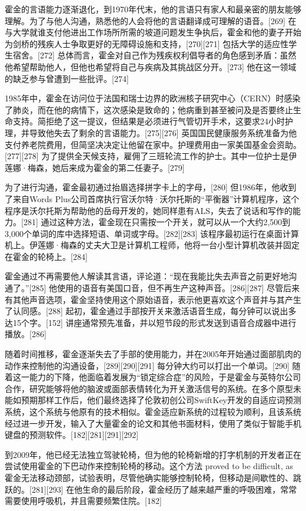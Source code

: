 霍金的言语能力逐渐退化，到1970年代末，他的言语只有家人和最亲密的朋友能够理解。为了与他人沟通，熟悉他的人会将他的言语翻译成可理解的语音。[269] 在与大学就谁支付他进出工作场所所需的坡道问题发生争执后，霍金和他的妻子开始为剑桥的残疾人士争取更好的无障碍设施和支持，[270][271] 包括大学的适应性学生宿舍。[272] 总体而言，霍金对自己作为残疾权利倡导者的角色感到矛盾：虽然他希望帮助他人，但他也希望将自己与疾病及其挑战区分开。[273] 他在这一领域的缺乏参与曾遭到一些批评。[274]

1985年中，霍金在访问位于法国和瑞士边界的欧洲核子研究中心（CERN）时感染了肺炎，而在他的病情下，这次感染是致命的；他病重到甚至被问及是否要终止生命支持。简拒绝了这一提议，但结果是必须进行气管切开手术，这要求24小时护理，并导致他失去了剩余的言语能力。[275][276] 英国国民健康服务系统准备为他支付养老院费用，但简坚决决定让他留在家中。护理费用由一家美国基金会资助。[277][278] 为了提供全天候支持，雇佣了三班轮流工作的护士。其中一位护士是伊莲娜·梅森，她后来成为霍金的第二任妻子。[279]

为了进行沟通，霍金最初通过抬眉选择拼字卡上的字母，[280] 但1986年，他收到了来自Words Plus公司首席执行官沃尔特·沃尔托斯的“平衡器”计算机程序，这个程序是沃尔托斯为帮助他的岳母开发的，她同样患有ALS，失去了说话和写作的能力。[281] 通过这种方法，霍金现在只需按一个开关，就可以从一个大约2,500到3,000个单词的库中选择短语、单词或字母。[282][283] 该程序最初运行在桌面计算机上。伊莲娜·梅森的丈夫大卫是计算机工程师，他将一台小型计算机改装并固定在霍金的轮椅上。[284]

霍金通过不再需要他人解读其言语，评论道：“现在我能比失去声音之前更好地沟通了。”[285] 他使用的语音有美国口音，但不再生产这种声音。[286][287] 尽管后来有其他声音选项，霍金坚持使用这个原始语音，表示他更喜欢这个声音并与其产生了认同感。[288] 起初，霍金通过手部按开关来激活语音生成，每分钟可以说出多达15个字。[152] 讲座通常预先准备，并以短节段的形式发送到语音合成器中进行播放。[286]

随着时间推移，霍金逐渐失去了手部的使用能力，并在2005年开始通过面部肌肉的动作来控制他的沟通设备，[289][290][291] 每分钟大约可以打出一个单词。[290] 随着这一能力的下降，他面临着发展为“锁定综合症”的风险，于是霍金与英特尔公司合作，研究能够将他的脑波或面部表情转化为开关激活信号的系统。在多个原型未能如预期那样工作后，他们最终选择了伦敦初创公司SwiftKey开发的自适应词预测系统，这个系统与他原有的技术相似。霍金适应新系统的过程较为顺利，且该系统经过进一步开发，输入了大量霍金的论文和其他书面材料，使用了类似于智能手机键盘的预测软件。[182][281][291][292]

到2009年，他已经无法独立驾驶轮椅，但为他的轮椅新增的打字机制的开发者正在尝试使用霍金的下巴动作来控制轮椅的移动。这个方法 proved to be difficult, as霍金无法移动颈部，试验表明，尽管他确实能够控制轮椅，但移动是间歇性的、跳跃的。[281][293] 在他生命的最后阶段，霍金经历了越来越严重的呼吸困难，常常需要使用呼吸机，并且需要频繁住院。[182]
